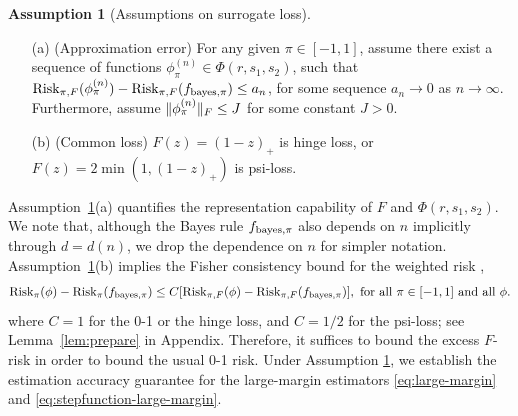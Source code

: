 \documentclass[11pt]{article}
\theoremstyle{plain}
\theoremstyle{definition}
\newtheorem{assumption}{Assumption}
\def\bayespif{f_{\textup{bayes},\pi}}
\def\risk{\textup{Risk}_\pi}
\def\riskF{\textup{Risk}_{\pi,F}}
\begin{document}
\begin{assumption}[Assumptions on surrogate loss]\label{ass:main} \hfill
\begin{enumerate}
\item[(a)] (Approximation error) For any given $\pi\in[-1,1]$, assume there exist a sequence of functions $\phi^{(n)}_\pi\in\Phi(r,s_1,s_2)$, such that $\riskF(\phi^{(n)}_\pi)-\riskF(\bayespif)\leq a_n$, for some sequence $a_n\to 0$ as $n\to\infty$. Furthermore, assume $\lVert\phi_{\pi}^{(n)}\rVert_F \leq J$ for some constant $J>0$. 
\item[(b)] (Common loss) $F(z)=(1-z)_{+}$ is hinge loss, or $F(z)=2\min(1,(1-z)_{+})$ is psi-loss. 
\end{enumerate}
\end{assumption}

\noindent
Assumption~\ref{ass:main}(a) quantifies the representation capability of $F$ and $\Phi(r, s_1, s_2)$. We note that, although the Bayes rule $\bayespif$ also depends on $n$ implicitly through $d=d(n)$, we drop the dependence on $n$ for simpler notation. Assumption~\ref{ass:main}(b) implies the Fisher consistency bound for the weighted risk \citep{scott2011surrogate},
\begin{equation*} \label{eq:fisher}
\risk(\phi)-\risk(\bayespif)\leq C[\riskF(\phi)-\riskF(\bayespif)], \text{ for all $\pi\in[-1,1]$ and all $\phi$}.
\end{equation*}
where $C=1$ for the 0-1 or the hinge loss, and $C=1/2$ for the psi-loss; see Lemma~\ref{lem:prepare} in Appendix. Therefore, it suffices to bound the excess $F$-risk in order to bound the usual 0-1 risk. Under Assumption \ref{ass:main}, we establish the estimation accuracy guarantee for the large-margin estimators \eqref{eq:large-margin} and \eqref{eq:stepfunction-large-margin}. 
\end{document}

